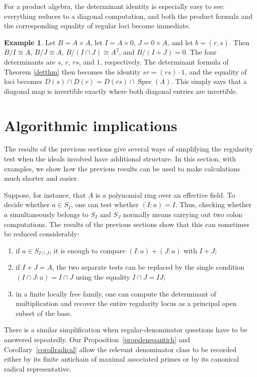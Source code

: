 \documentclass[11pt,leqno]{amsart}
\theoremstyle{definition}
\newtheorem{example}[theorem]{Example}
\numberwithin{equation}{section}
\DeclareMathOperator{\Spec}{Spec}
\begin{document}
For a product algebra, the determinant identity is especially easy to see: everything reduces to a diagonal computation, and both the product formula and the corresponding equality of regular loci become immediate.

\begin{example}
Let $B=A\times A$, let $I=A\times0$, $J=0\times A$, and let $b=(r,s)$. Then
$
B/I\cong A$, $B/J\cong A$, $B/(I\cap J)\cong A^2$, and
$ B/(I+J)=0$.
The four determinants are $s$, $r$, $rs$, and $1$, respectively. The determinant formula of Theorem \ref{detthm} then becomes the identity $sr=(rs)\cdot1$, and the equality of loci becomes $D(s)\cap D(r)=D(rs)\cap\Spec(A)$. This simply says that a diagonal map is invertible exactly where both diagonal entries are invertible.
\end{example}

\section{Algorithmic implications}\label{sec:alg}
The results of the previous sections give several ways of simplifying the regularity test when the ideals involved have additional structure. In this section, with examples, we show how the previous results can be used to make calculations much shorter and easier.


Suppose, for instance, that $A$ is a polynomial ring over an effective field. To decide whether $a\in S_I$, one can test whether
$(I:a)=I$.
Thus, checking whether $a$ simultaneously belongs to $S_I$ and $S_J$ normally means carrying out two colon computations. The results of the previous sections show that this can sometimes be reduced considerably:
\begin{enumerate}
	\item if $a\in S_{I\cap J}$, it is enough to compare $(I:a)+(J:a)$ with $I+J$;
	\item if $I+J=A$, the two separate tests can be replaced by the single condition
	$(I\cap J:a)=I\cap J$
	using the equality $I\cap J=IJ$;
	\item in a finite locally free family, one can compute the determinant of multiplication and recover the entire regularity locus as a principal open subset of the base.
\end{enumerate}
There is a similar simplification when regular-denominator questions have to be answered repeatedly. Our Proposition~\ref{propdeneqantich} and Corollary~\ref{corollradical} allow the relevant denominator class to be recorded either by its finite antichain of maximal associated primes or by its canonical radical representative.
\end{document}
